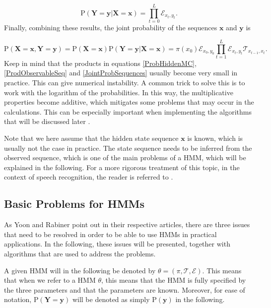 \documentclass{article}\usepackage[]{graphicx}\usepackage[]{color}
\begin{document}
\begin{equation}
    \text{P}(\mathbf{Y} = \mathbf{y}|\mathbf{X}= \mathbf{x}) = \prod_{t=0}^L\mathcal{E}_{x_t, y_t}.
    \label{ProdObservableSeq}
\end{equation}
Finally, combining these results, the joint probability of the sequences $\mathbf{x}$ and $\mathbf{y}$ is 

\begin{equation}
    \text{P}(\mathbf{X} = \mathbf{x}, \mathbf{Y}= \mathbf{y}) = \text{P}(\mathbf{X}= \mathbf{x})\text{P}(\mathbf{Y}= \mathbf{y}|\mathbf{X}= \mathbf{x}) = \pi(x_0)\mathcal{E}_{x_0, y_0}\prod_{t=1}^L\mathcal{E}_{x_t, y_t}\mathcal{T}_{x_{t-1}, x_t}.
    \label{JointProbSequences}
\end{equation}
Keep in mind that the products in equations \eqref{ProbHiddenMC}, \eqref{ProdObservableSeq} and \eqref{JointProbSequences} usually become very small in practice. This can give numerical instability. A common trick to solve this is to work with the logarithm of the probabilities. In this way, the multiplicative properties become additive, which mitigates some problems that may occur in the calculations. This can be especially important when implementing the algorithms that will be discussed later \cite{Christianini2006}. 

Note that we here assume that the hidden state sequence $\mathbf{x}$ is known, which is usually not the case in practice. The state sequence needs to be inferred from the observed sequence, which is one of the main problems of a HMM, which will be explained in the following. For a more rigorous treatment of this topic, in the context of speech recognition, the reader is referred to \cite{Rabiner1989}.


\subsection{Basic Problems for HMMs}
As Yoon \cite{Yoon2009} and Rabiner \cite{Rabiner1989} point out in their respective articles, there are three issues that need to be resolved in order to be able to use HMMs in practical applications. In the following, these issues will be presented, together with algorithms that are used to address the problems. 

A given HMM will in the following be denoted by $\theta = (\pi, \mathcal{T}, \mathcal{E})$. This means that when we refer to a HMM $\theta$, this means that the HMM is fully specified by the three parameters and that the parameters are known. Moreover, for ease of notation, $\text{P}(\mathbf{Y} = \mathbf{y})$ will be denoted as simply $\text{P}(\mathbf{y})$ in the following. 
\end{document}

